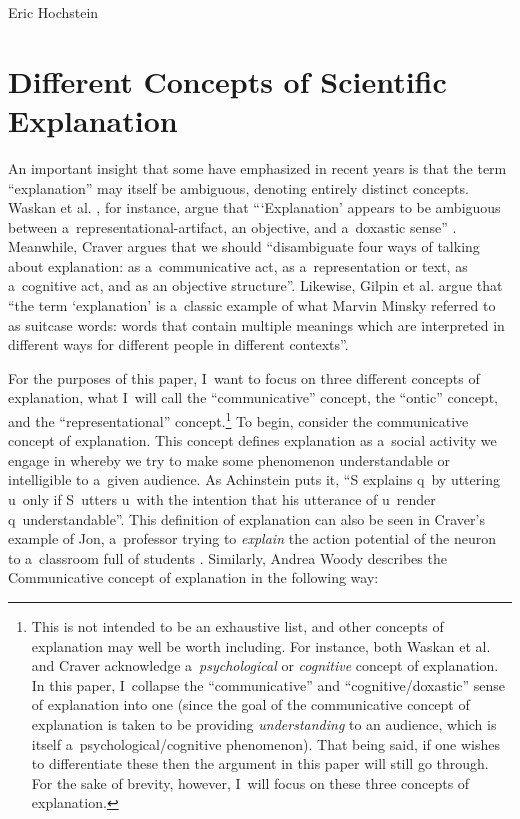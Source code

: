 \begin{artengenv}{Eric Hochstein}
\section{Different Concepts of Scientific Explanation}
An important insight that some have emphasized in recent years is that the term ``explanation'' may itself be ambiguous, denoting entirely distinct concepts. Waskan et al.
\parencite*[][]{izadi_building_2014}, %
 for instance, argue that ``‘Explanation' appears to be ambiguous between a~representational-artifact, an objective, and a~doxastic sense'' 
\parencite[][p.3090]{bello_three_2014}. %
 Meanwhile, Craver 
\parencite*[][p.29]{kaiser_ontic_2014} %
 argues that we should ``disambiguate four ways of talking about explanation: as a~communicative act, as a~representation or text, as a~cognitive act, and as an objective structure''. Likewise, Gilpin et al. 
\parencite*[][p.3]{gilpin_explanation_2022} %
 argue that ``the term ‘explanation' is a~classic example of what Marvin Minsky referred to as suitcase words: words that contain multiple meanings which are interpreted in different ways for different people in different contexts''.

For the purposes of this paper, I~want to focus on three different concepts of explanation, what I~will call the ``communicative'' concept, the ``ontic'' concept, and the ``representational'' concept.\footnote{This is not intended to be an exhaustive list, and other concepts of explanation may well be worth including. For instance, both Waskan et al. and Craver acknowledge a~\textit{psychological} or \textit{cognitive} concept of explanation. In this paper, I~collapse the ``communicative'' and ``cognitive/doxastic'' sense of explanation into one (since the goal of the communicative concept of explanation is taken to be providing \textit{understanding} to an audience, which is itself a~psychological/cognitive phenomenon). That being said, if one wishes to differentiate these then the argument in this paper will still go through. For the sake of brevity, however, I~will focus on these three concepts of explanation.} To begin, consider the communicative concept of explanation. This concept defines explanation as a~social activity we engage in whereby we try to make some phenomenon understandable or intelligible to a~given audience. As Achinstein
\parencite*[][pp.16–17]{achinstein_nature_1983} %
 puts it, ``S explains q~by uttering u~only if S~utters u~with the intention that his utterance of u~render q~understandable''. This definition of explanation can also be seen in Craver's example of Jon, a~professor trying to \textit{explain} the action potential of the neuron to a~classroom full of students 
\parencite[][p.30]{kaiser_ontic_2014}. %
 Similarly, Andrea Woody describes the Communicative concept of explanation in the following way:


\end{artengenv}
